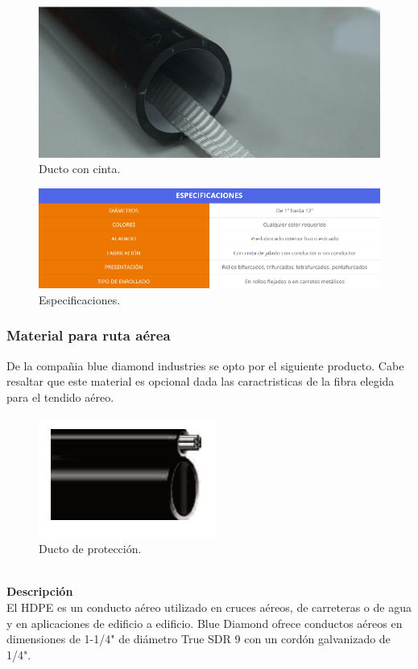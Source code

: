 \documentclass[12pt,letterpaper]{article}
\begin{document}
\begin{figure}[ht]
    \centering
    \includegraphics[width=.5\textwidth]{f31.png}
    \caption{Ducto con cinta.}
\end{figure}

\begin{figure}[ht]
    \centering
    \includegraphics[width=.8\textwidth]{f32.png}
    \caption{Especificaciones.}
\end{figure}

\newpage
\subsubsection{Material para ruta aérea}
De la compañia blue diamond industries se opto por el siguiente producto. Cabe resaltar que 
este material es opcional dada las caractristicas de la fibra elegida para el tendido aéreo.
\begin{figure}[ht]
    \centering
    \includegraphics[width=.5\textwidth]{f15.png}
    \caption{Ducto de protección.}
\end{figure}
\\
\textbf{Descripción}
\\
El HDPE es un conducto aéreo utilizado en cruces aéreos, de carreteras o de agua 
y en aplicaciones de edificio a edificio. Blue Diamond ofrece conductos aéreos en 
dimensiones de 1-1/4" de diámetro True SDR 9 con un cordón galvanizado de 1/4".
\end{document}
